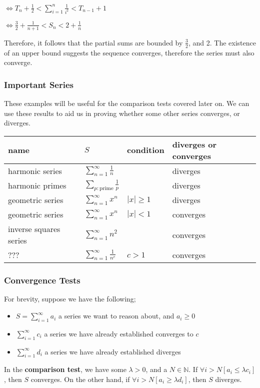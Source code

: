 \documentclass[a4paper, 12pt]{article}
\newcommand{\summation}[3]{\sum\limits_{#1}^{#2} #3}
\begin{document}
                $\Leftrightarrow T_n + \frac{1}{2} < \summation{i = 1}{n}{\frac{1}{i^2}} < T_{n - 1} + 1$
                \medskip

                $\Leftrightarrow \frac{3}{2} + \frac{1}{n + 1} < S_n < 2 + \frac{1}{n}$
                \medskip

                Therefore, it follows that the partial sums are bounded by $\frac{3}{2}$, and 2. The existence of an upper bound suggests the sequence converges, therefore the series must also converge.
            \subsubsection*{Important Series}
                These examples will be useful for the comparison tests covered later on. We can use these results to aid us in proving whether some other series converges, or diverges.
                \begin{center}
                    \begin{tabular}{l|l|l|l}
                        name & $S$ & condition & diverges or converges \\
                        \hline
                        harmonic series & $\summation{n = 1}{\infty}{\frac{1}{n}}$ & & diverges \\
                        harmonic primes & $\summation{p : \text{prime}}{}{\frac{1}{p}}$ & & diverges \\
                        geometric series & $\summation{n = 1}{\infty}{x^n}$ & $|x| \geq 1$ & diverges \\
                        geometric series & $\summation{n = 1}{\infty}{x^n}$ & $|x| < 1$ & converges \\
                        inverse squares series & $\summation{n = 1}{\infty}{n^2}$ & & converges \\
                        ??? & $\summation{n = 1}{\infty}{\frac{1}{n^c}}$ & $c > 1$ & converges
                    \end{tabular}
                \end{center}
            \subsubsection*{Convergence Tests}
                For brevity, suppose we have the following;
                \begin{itemize}
                    \itemsep0em
                    \item $S = \summation{i = 1}{\infty}{a_i}$ \hfill a series we want to reason about, and $a_i \geq 0$
                    \item $\summation{i = 1}{\infty}{c_i}$ \hfill a series we have already established converges to $c$
                    \item $\summation{i = 1}{\infty}{d_i}$ \hfill a series we have already established diverges
                \end{itemize}
                In the \textbf{comparison test}, we have some $\lambda > 0$, and a $N \in \mathbb{N}$. If $\forall i > N [a_i \leq \lambda c_i]$, then $S$ converges. On the other hand, if $\forall i > N [a_i \geq \lambda d_i]$, then $S$ diverges.
                \medskip
\end{document}
